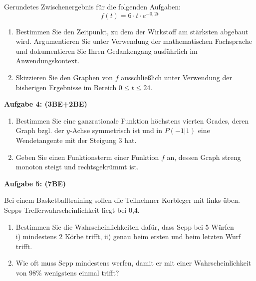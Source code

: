 \documentclass[a4paper,12pt]{article}
\newcommand{\Aufgabe}[1]{
  {
  \vspace*{0.5cm}
  \textsf{\textbf{Aufgabe #1}}
  \vspace*{0.2cm}
  
  }
}
\begin{document}
Gerundetes Zwischenergebnis für die folgenden Aufgaben: 
\[ f(t)=6 \cdot t \cdot e^{-0,2t} \]


\begin{enumerate}[label={\alph*)}]
  \item Bestimmen Sie den Zeitpunkt, zu dem der Wirkstoff am stärksten abgebaut wird. Argumentieren Sie unter Verwendung der mathematischen Fachsprache und dokumentieren Sie Ihren Gedankengang ausführlich im Anwendungskontext.
  \item Skizzieren Sie den Graphen von $f$ ausschließlich unter Verwendung der bisherigen Ergebnisse im Bereich $0 \le t \le 24$.
\end{enumerate}

\newpage
\Aufgabe{4: (3BE+2BE)} 
\begin{enumerate}[label={\alph*)}] 
  \item Bestimmen Sie eine ganzrationale Funktion höchstens vierten Grades, deren Graph bzgl. der $y$-Achse symmetrisch ist und in $P (-1|1)$ eine Wendetangente mit der Steigung 3 hat.
  \item Geben Sie einen Funktionsterm einer Funktion $f$ an, dessen Graph streng monoton steigt und rechtsgekrümmt ist.
\end{enumerate}




\Aufgabe{5: (7BE)} 
Bei einem Basketballtraining sollen die Teilnehmer Korbleger mit links üben. Sepps Trefferwahrscheinlichkeit liegt bei 0,4.
\begin{enumerate}[label={\alph*)}] 
  \item Bestimmen Sie die Wahrscheinlichkeiten dafür, dass Sepp bei 5 Würfen\\
    i) mindestens 2 Körbe trifft,  ii) genau beim ersten und beim letzten Wurf trifft.
  \item Wie oft muss Sepp mindestens werfen, damit er mit einer Wahrscheinlichkeit von 98\% wenigstens einmal trifft?
\end{enumerate}
\end{document}
